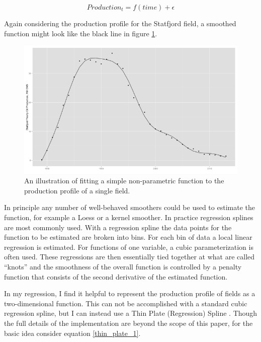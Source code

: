 \documentclass[12pt]{article}
\begin{document}
\begin{equation}
Production_{t}=f(time) + \epsilon
	\label{simp_eqn}
\end{equation}

Again considering the production profile for the Statfjord field, a smoothed function might look like the black line in figure \ref{statfjord_gam}.   

\begin{figure}
	\includegraphics[width=1\textwidth]{figures/statfjord_gam_print.png}
	\caption{An illustration of fitting a simple non-parametric function to the production profile of a single field.}
	\label{statfjord_gam}
\end{figure}

In principle any number of well-behaved smoothers could be used to estimate the function, for example a Loess or a kernel smoother.  In practice regression splines are most commonly used.  With a regression spline the data points for the function to be estimated are broken into bins.  For each bin of data a local linear regression is estimated.  For functions of one variable, a cubic parameterization is often used.  These regressions are then essentially tied together at what are called “knots” and the smoothness of the overall function is controlled by a penalty function that consists of the second derivative of the estimated function.

In my regression, I find it helpful to represent the production profile of fields as a two-dimensional function.  This can not be accomplished with a standard cubic regression spline, but I can instead use a Thin Plate (Regression) Spline \citep{wood_thin_2003}.  Though the full details of the implementation are beyond the scope of this paper, for the basic idea consider equation \ref{thin_plate_1}.  
\end{document}
